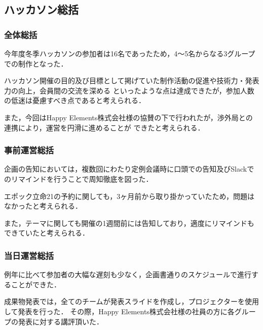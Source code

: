 \subsection*{ハッカソン総括}


\subsubsection*{全体総括}

今年度冬季ハッカソンの参加者は16名であったため，4〜5名からなる3グループでの制作となった．

ハッカソン開催の目的及び目標として掲げていた制作活動の促進や技術力・発表力の向上，会員間の交流を深める
といったような点は達成できたが，参加人数の低迷は憂慮すべき点であると考えられる．

また，今回はHappy Elements株式会社様の協賛の下で行われたが，渉外局との連携により，運営を円滑に進めることが
できたと考えられる．

\subsubsection*{事前運営総括}

企画の告知においては，複数回にわたり定例会議時に口頭での告知及びSlackでのリマインドを行うことで周知徹底を図った．

エポック立命21の予約に関しても，3ヶ月前から取り掛かっていたため，問題はなかったと考えられる．

また，テーマに関しても開催の1週間前には告知しており，適度にリマインドもできていたと考えられる．

\subsubsection*{当日運営総括}

例年に比べて参加者の大幅な遅刻も少なく，企画書通りのスケジュールで進行することができた．

成果物発表では，全てのチームが発表スライドを作成し，プロジェクターを使用して発表を行った．
その際，Happy Elements株式会社様の社員の方に各グループの発表に対する講評頂いた．

